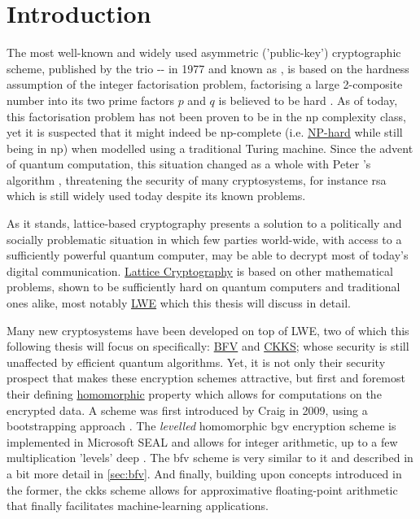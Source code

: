 \chapter{Introduction}
\label{chap:introduction}
The most well-known and widely used asymmetric ('public-key') cryptographic scheme, published by the trio -- in 1977 and known as , is based on the hardness assumption of the integer factorisation problem, factorising a large 2-composite number into its two prime factors $p$ and $q$ is believed to be hard \parencite{1983-rsa}.
As of today, this factorisation problem has not been proven to be in the \gls{np} complexity class, yet it is suspected that it might indeed be \gls{np}-complete (i.e. \hyperref[def:np-hard]{NP-hard} while still being in \gls{np}) when modelled using a traditional Turing machine.
Since the advent of quantum computation, this situation changed as a whole with Peter 's algorithm \parencite{1997-shors-algorithm}, threatening the security of many cryptosystems, for instance \gls{rsa} which is still widely used today despite its known problems.

As it stands, lattice-based cryptography presents a solution to a politically and socially problematic situation in which few parties world-wide, with access to a sufficiently powerful quantum computer, may be able to decrypt most of today's digital communication.
\hyperref[subsec:lattice-crypto]{Lattice Cryptography} is based on other mathematical problems, shown to be sufficiently hard on quantum computers and traditional ones alike, most notably \hyperref[def:lwe-search-problem]{LWE} \parencite{2005-lwe-original} which this thesis will discuss in detail.

Many new cryptosystems have been developed on top of LWE, two of which this following thesis will focus on specifically: \hyperref[def:bfv-scheme]{BFV} and \hyperref[def:ckks-scheme]{CKKS};
whose security is still unaffected by efficient quantum algorithms.
Yet, it is not only their security prospect that makes these encryption schemes attractive, but first and foremost their defining \hyperref[def:ring-homomorphism]{homomorphic} property which allows for computations on the encrypted data.
A  scheme was first introduced by Craig  in 2009, using a bootstrapping approach \parencite{2009-gentry-fhe-original}.
The \textit{levelled} homomorphic \gls{bgv} encryption scheme is implemented in Microsoft SEAL and allows for integer arithmetic, up to a few multiplication 'levels' deep \parencite{2012-bgv-original}.
The \gls{bfv} scheme \parencite{2012-fv-original,2012-brakerski} is very similar to it and described in a bit more detail in \autoref{sec:bfv}.
And finally, building upon concepts introduced in the former, the \gls{ckks} scheme \parencite{2017-ckks-original} allows for approximative floating-point arithmetic that finally facilitates machine-learning applications.

